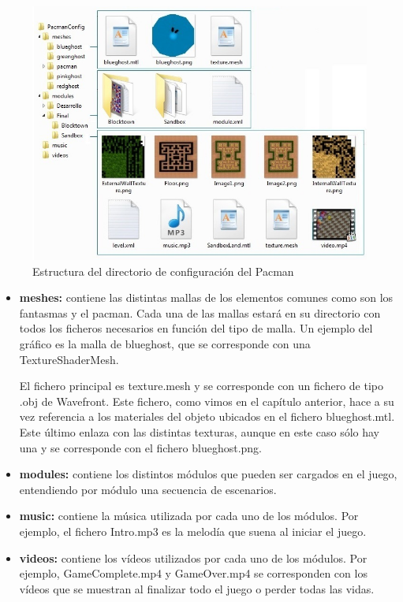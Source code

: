 \begin{figure}[h]
\centering
\includegraphics[width=14cm]{img/EstructuraPacmanConfig.jpg}	
\caption{Estructura del directorio de configuración del Pacman}
\end{figure}

\begin{itemize}
\item \textbf{meshes:} contiene las distintas mallas de los elementos comunes como son los fantasmas y el pacman. Cada una de las mallas estará en su directorio con todos los ficheros necesarios en función del tipo de malla. Un ejemplo del gráfico es la malla de blueghost, que se corresponde con una TextureShaderMesh.

El fichero principal es texture.mesh y se corresponde con un fichero de tipo .obj de Wavefront. Este fichero, como vimos en el capítulo anterior, hace a su vez referencia a los materiales del objeto ubicados en el fichero blueghost.mtl. Este último enlaza con las distintas texturas, aunque en este caso sólo hay una y se corresponde con el fichero blueghost.png.
\item \textbf{modules:} contiene los distintos módulos que pueden ser cargados en el juego, entendiendo por módulo una secuencia de escenarios.
\item \textbf{music:} contiene la música utilizada por cada uno de los módulos. Por ejemplo, el fichero Intro.mp3 es la melodía que suena al iniciar el juego.
\item \textbf{videos:} contiene los vídeos utilizados por cada uno de los módulos. Por ejemplo, GameComplete.mp4 y GameOver.mp4 se corresponden con los vídeos que se muestran al finalizar todo el juego o perder todas las vidas.
\end{itemize}
\newpage

